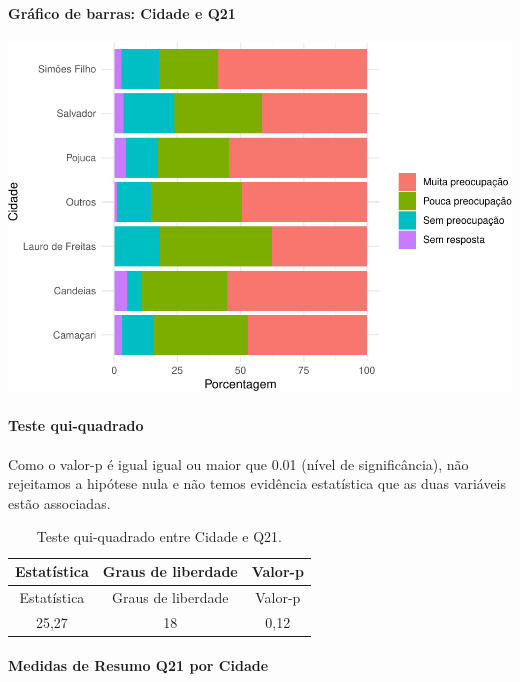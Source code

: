 \documentclass[]{article}
\let\oldparagraph\paragraph
\renewcommand{\paragraph}[1]{\oldparagraph{#1}\mbox{}}
\begin{document}
\hypertarget{gruxe1fico-de-barras-cidade-e-q21}{%
\paragraph{Gráfico de barras: Cidade e Q21}\label{gruxe1fico-de-barras-cidade-e-q21}}

\begin{center}\includegraphics[width=0.75\linewidth]{relatorio_covid19_files/figure-latex/unnamed-chunk-427-1} \end{center}

\hypertarget{teste-qui-quadrado-37}{%
\paragraph{Teste qui-quadrado}\label{teste-qui-quadrado-37}}

Como o valor-p é igual igual ou maior que 0.01 (nível de significância), não rejeitamos a hipótese nula e não temos evidência estatística que as duas variáveis estão associadas.

\begin{longtable}[]{@{}ccc@{}}
\caption{\label{tab:unnamed-chunk-429}Teste qui-quadrado entre Cidade e Q21.}\tabularnewline
\toprule
Estatística & Graus de liberdade & Valor-p\tabularnewline
\midrule
\endfirsthead
\toprule
Estatística & Graus de liberdade & Valor-p\tabularnewline
\midrule
\endhead
25,27 & 18 & 0,12\tabularnewline
\bottomrule
\end{longtable}

\cleardoublepage

\hypertarget{medidas-de-resumo-q21-por-cidade}{%
\paragraph{Medidas de Resumo Q21 por Cidade}\label{medidas-de-resumo-q21-por-cidade}}
\end{document}
